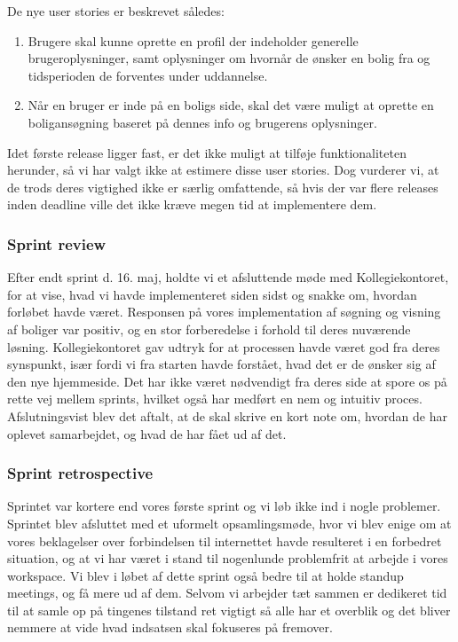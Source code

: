 \documentclass[12pt, a4paper]{report}
\begin{document}
De nye user stories er beskrevet således:

\begin{enumerate}

\item Brugere skal kunne oprette en profil der indeholder generelle brugeroplysninger, samt oplysninger om hvornår de ønsker en bolig fra og tidsperioden de forventes under uddannelse.

\item Når en bruger er inde på en boligs side, skal det være muligt at oprette en boligansøgning baseret på dennes info og brugerens oplysninger.

\end{enumerate}

Idet første release ligger fast, er det ikke muligt at tilføje funktionaliteten herunder, så vi har valgt ikke at estimere disse user stories. Dog vurderer vi, at de trods deres vigtighed ikke er særlig omfattende, så hvis der var flere releases inden deadline ville det ikke kræve megen tid at implementere dem.

\subsubsection{Sprint review}

Efter endt sprint d. 16. maj, holdte vi et afsluttende møde med Kollegiekontoret, for at vise, hvad vi havde implementeret siden sidst og snakke om, hvordan forløbet havde været. Responsen på vores implementation af søgning og visning af boliger var positiv, og en stor forberedelse i forhold til deres nuværende løsning. Kollegiekontoret gav udtryk for at processen havde været god fra deres synspunkt, især fordi vi fra starten havde forstået, hvad det er de ønsker sig af den nye hjemmeside. Det har ikke været nødvendigt fra deres side at spore os på rette vej mellem sprints, hvilket også har medført en nem og intuitiv proces. Afslutningsvist blev det aftalt, at de skal skrive en kort note om, hvordan de har oplevet samarbejdet, og hvad de har fået ud af det.

\subsubsection{Sprint retrospective}

Sprintet var kortere end vores første sprint og vi løb ikke ind i nogle problemer. Sprintet blev afsluttet med et uformelt opsamlingsmøde, hvor vi blev enige om at vores beklagelser over forbindelsen til internettet havde resulteret i en forbedret situation, og at vi har været i stand til nogenlunde problemfrit at arbejde i vores workspace. Vi blev i løbet af dette sprint også bedre til at holde standup meetings, og få mere ud af dem. Selvom vi arbejder tæt sammen er dedikeret tid til at samle op på tingenes tilstand ret vigtigt så alle har et overblik og det bliver nemmere at vide hvad indsatsen skal fokuseres på fremover.
\end{document}
